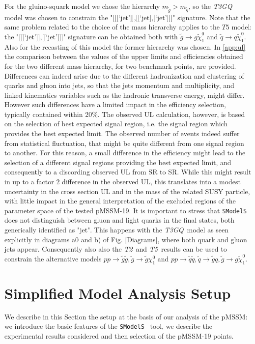 \documentclass[a4paper,11pt]{article}
\newcommand{\SMO}{\texttt{SModelS\xspace}}
\newcommand{\TGQ}{ \textit{T3GQ}}
\newcommand{\Ttwo}{ \textit{T2}}
\newcommand{\Tfive}{ \textit{T5}}
\begin{document}
For the gluino-squark model we chose the hierarchy $m_{\tilde g} > m_{\tilde q}$, so the \textit{T3GQ} model was chosen to constrain the "[[[`jet']],[[`jet],[`jet']]]" signature. Note that the same problem related to the choice of the mass hierarchy applies to the $T5$ model: the "[[[`jet']],[[`jet']]]" signature can be obtained both with $\tilde g \rightarrow g \tilde \chi _1 ^0$ and $\tilde q \rightarrow q \tilde \chi _1 ^0$. Also for the recasting of this model the former hierarchy was chosen. In \ref{app:ul} the comparison between the values of the upper limits and efficiencies obtained for the two different mass hierarchy, for two benchmark points, are provided. Differences can indeed arise due to the different hadronization and clustering of quarks and gluon into jets, so that the jets momentum and multiplicity, and linked kinematics variables such as the hadronic transverse energy, might differ. However such differences have a limited impact in the efficiency selection, typically contained within 20$\%$. The observed UL calculation, however, is based on the selection of best expected signal region, i.e. the signal region which provides the best expected limit. The observed number of events indeed suffer from statistical fluctuation, that might be quite different from one signal region to another. For this reason, a small difference in the efficiency might lead to the selection of a different signal regions providing the best expected limit, and consequently to a discording observed UL from SR to SR. While this might result in up to a factor 2 difference in the observed UL, this translates into a modest uncertainty in the cross section UL and in the mass of the related SUSY particle, with little impact in the general interpretation of the excluded regions of the parameter space of the tested pMSSM-19. 
%
It is important to stress that \SMO~ does not distinguish between gluon and light quarks in the final states, both generically identified as "jet". This happens with the \TGQ~model as seen explicitly in diagrams a0 and b) of Fig. \ref{Diagrams}, where both quark and gluon jets appear. Consequently also also the \Ttwo~and\Tfive~results can be used to constrain the alternative models $p p \rightarrow \tilde g \tilde g ,\tilde g \rightarrow \tilde g \chi _1 ^0$ and $p p \rightarrow \tilde q \tilde q ,\tilde q \rightarrow \tilde g q, \tilde g \rightarrow g \tilde \chi _1 ^0$.  
%
\section{Simplified Model Analysis Setup}\label{sec::setup}
%
We describe in this Section the setup at the basis of our analysis of the pMSSM: we introduce the basic features of the \SMO~ tool, we describe the experimental results considered and then selection of the pMSSM-19 points. 
\end{document}
